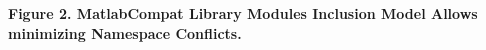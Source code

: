 \textbf{Figure 2. MatlabCompat Library Modules Inclusion Model Allows minimizing Namespace Conflicts.}
  